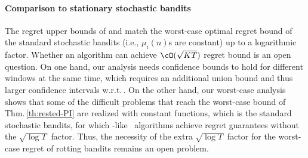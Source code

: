 \paragraph{Comparison to stationary stochastic bandits}
The regret upper bounds of \FEWA and \RUCB match the worst-case optimal regret bound of the standard stochastic bandits (i.e., $\mu_i(n)$s are constant) up to a logarithmic factor. Whether an algorithm can achieve $\cO(\sqrt{KT})$ regret bound is an open question. On one hand, our analysis needs confidence bounds to hold for different windows at the same time, which requires an additional union bound and thus larger confidence intervals w.r.t.\,\UCBone. On the other hand, our worst-case analysis shows that some of the difficult problems that reach the worst-case bound of Thm.\,\ref{th:rested-PI} are realized with constant functions, which is the standard stochastic bandits, for which \MOSS-like~\citep{audibert2009minimax} algorithms achieve regret guarantees without the $\sqrt{\log T}$ factor. Thus, the necessity of the extra $\sqrt{\log T}$ factor for the worst-case regret of rotting bandits remains an open problem.

